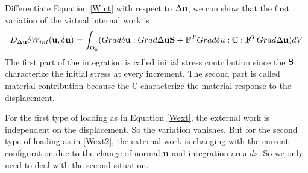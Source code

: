Differentiate Equation \ref{Wint} with respect to $\Delta{\bold{u}}$, we can show that the first variation of the virtual internal work is
\begin{equation} \label{Kint}
D_{\Delta{\bold{u}}}\delta{W_{int}}(\bold{u}, \delta{\bold{u}}) = \int_{\Omega_0}(Grad\delta\bold{u} : Grad\Delta\bold{u}\bold{S} + \bold{F}^TGrad\delta{u} : \mathbb{C} : \bold{F}^T Grad\Delta\bold{u})dV
\end{equation}
The first part of the integration is called initial stress contribution since the $\bold{S}$ characterize the initial stress at every increment. The second part is called material contribution because the $\mathbb{C}$ characterize the material response to the displacement.

For the first type of loading as in Equation \ref{Wext}, the external work is independent on the displacement. So the variation vanishes. But for the second type of loading as in \ref{Wext2}, the external work is changing with the current configuration due to the change of normal $\bold{n}$ and integration area $ds$. So we only need to deal with the second situation.

